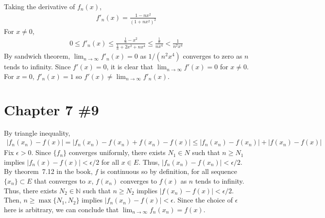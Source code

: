 \documentclass{scrartcl}
\begin{document}
Taking the derivative of \(f_n(x)\),
\begin{align*}
  f'_n(x) = \frac{1 - nx^2}{(1 + nx^2)^2}
\end{align*}
For \(x \not = 0\),
\begin{align*}
  0 \leq f'_n(x) \leq \frac{\frac{1}{n} - x^2}{\frac{1}{n} + 2x^2 + nx^4}
  \leq \frac{\frac{1}{n}}{nx^4} < \frac{1}{n^2x^4}
\end{align*}
By sandwich theorem, \(\lim_{n \to \infty} f'_n(x) = 0\) as \(1 / (n^2x^4)\)
converges to zero as \(n\) tends to infinity. Since \(f'(x) = 0\), it is clear
that \(\lim_{n \to \infty} f'(x) = 0\) for \(x \not = 0\).
For \(x = 0\), \(f'_n(x) = 1\) so \(f'(x) \not = \lim_{n \to \infty} f'_n(x)\).

\section{Chapter 7 \#9}
By triangle inequality,
\begin{align*}
  |f_n(x_n) - f(x)| = |f_n(x_n) - f(x_n) + f(x_n) - f(x)|
  \leq |f_n(x_n) - f(x_n)| + |f(x_n) - f(x)|
\end{align*}
Fix \(\epsilon > 0\). Since \(\{f_n\}\) converges uniformly, there exists
\(N_1 \in N\) such that \(n \geq N_1\) implies \(|f_n(x) - f(x)| < \epsilon /
2\) for all \(x \in E\). Thus, \(|f_n(x_n) - f(x_n)| < \epsilon / 2\). By
theorem~7.12 in the book, \(f\) is continuous so by definition, for all
sequence \(\{x_n\} \subset E\) that converges to \(x\), \(f(x_n)\) converges to
\(f(x)\) as \(n\) tends to infinity. Thus, there exists \(N_2 \in \mathbb{N}\)
such that \(n \geq N_2\) implies \(|f(x_n) - f(x)| < \epsilon / 2\). Then, \(n
\geq \max \{N_1, N_2\}\) implies \(|f_n(x_n) - f(x)| < \epsilon\). Since the
choice of \(\epsilon\) here is arbitrary, we can conclude that \(\lim_{n \to
\infty} f_n(x_n) = f(x)\).
\end{document}
